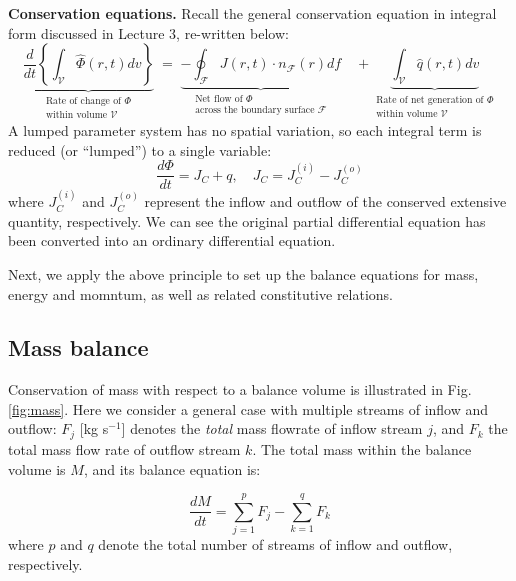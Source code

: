 \documentclass[a4paper,11pt]{article}
\theoremstyle{definition}
\begin{document}
\textbf{Conservation equations.} Recall the general conservation equation in integral form discussed
in Lecture 3, re-written below:
\begin{equation}
	\underbrace{ \frac{d}{d t} \left\{ \int_{\mathcal{V}} \hat{\Phi} (r, t) dv \right\} }_{\substack{ \text{Rate of change of $\Phi$} \\ \text{within volume $\mathcal{V}$} } } 
		\; = \; \underbrace{ -\oint_{\mathcal{F}} J(r,t) \cdot n_{\mathcal{F}}(r) d f }_{\substack{ \text{Net flow of $\Phi$} \\ \text{across the boundary surface $\mathcal{F}$} } }
		\quad + \underbrace{ \int_{\mathcal{V}} \hat{q}(r, t) dv }_{\substack{ \text{Rate of net generation of $\Phi$} \\ \text{within volume $\mathcal{V}$} } }
\end{equation}
\noindent A lumped parameter system has no spatial variation, so each integral term is reduced (or ``lumped'')
to a single variable:
\begin{equation}
	\frac{d \Phi}{d t} = J_C + q, \quad J_C = J_C^{(i)} - J_C^{(o)}
\end{equation} 
\noindent where $J_C^{(i)}$ and $J_C^{(o)}$ represent the inflow and outflow of the conserved extensive quantity, respectively.
We can see the original partial differential equation has been converted into an ordinary differential equation.

Next, we apply the above principle to set up the balance equations for mass, energy and momntum, 
as well as related constitutive relations.

\subsection*{Mass balance}

Conservation of mass with respect to a balance volume is illustrated in Fig. \ref{fig:mass}.
Here we consider a general case with multiple streams of inflow and outflow: $F_j$ [kg s$^{-1}$]
denotes the \emph{total} mass flowrate of inflow stream $j$, and $F_k$ the total mass flow rate of outflow stream $k$.
The total mass within the balance volume is $M$, and its balance equation is:

\begin{equation} \label{eq:mass_total}
	\frac{d M}{d t} = \sum_{j=1}^p F_j - \sum_{k=1}^q F_k
\end{equation}
\noindent where $p$ and $q$ denote the total number of streams of inflow and outflow, respectively.
\end{document}
